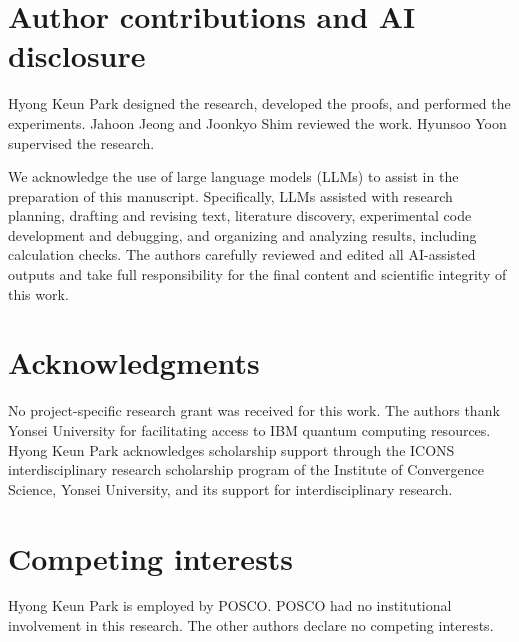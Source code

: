 \documentclass[a4paper,twocolumn,11pt,unpublished]{quantumarticle}
\begin{document}
\section*{Author contributions and AI disclosure}
Hyong Keun Park designed the research, developed the proofs, and
performed the experiments. Jahoon Jeong and Joonkyo Shim reviewed
the work. Hyunsoo Yoon supervised the research.

We acknowledge the use of large language models (LLMs) to assist in
the preparation of this manuscript. Specifically, LLMs assisted with
research planning, drafting and revising text, literature discovery,
experimental code development and debugging, and organizing and
analyzing results, including calculation checks. The authors carefully
reviewed and edited all AI-assisted outputs and take full
responsibility for the final content and scientific integrity of
this work.

\section*{Acknowledgments}
No project-specific research grant was received for this work.
The authors thank Yonsei University for facilitating access to IBM
quantum computing resources. Hyong Keun Park acknowledges
scholarship support through the ICONS interdisciplinary research
scholarship program of the Institute of Convergence Science,
Yonsei University, and its support for interdisciplinary research.

\section*{Competing interests}
Hyong Keun Park is employed by POSCO. POSCO had no institutional
involvement in this research. The other authors declare no
competing interests.

\begingroup
\raggedright


\endgroup

\onecolumn\newpage
\appendix













\end{document}
